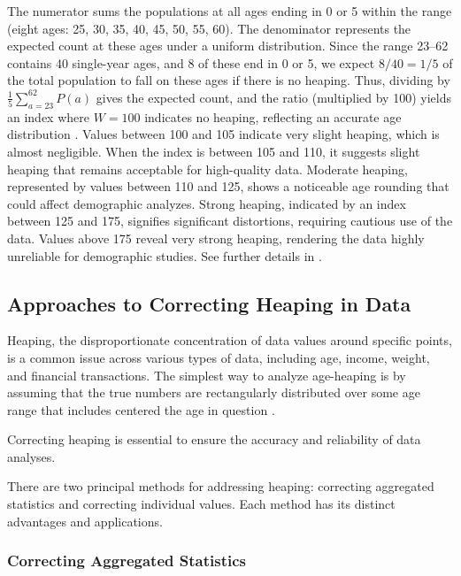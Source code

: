 \documentclass[12pt]{article}
\theoremstyle{plain}
\theoremstyle{definition}
\begin{document}
The numerator sums the populations at all ages ending in 0 or 5 within the
range (eight ages: 25, 30, 35, 40, 45, 50, 55, 60).
The denominator represents the expected count at these ages under
a uniform distribution. Since the range 23--62 contains 40 single-year ages,
and 8 of these end in 0 or 5, we expect $8/40 = 1/5$ of the total
population to fall on these ages if there is no heaping.
Thus, dividing by $\frac{1}{5} \sum_{a=23}^{62} P(a)$ gives the
expected count, and the ratio (multiplied by 100) yields an index
where $W = 100$ indicates no heaping, reflecting an accurate age distribution \citep{un55}.
Values between 100 and 105 indicate very slight heaping, which is almost negligible. When the index is between 105 and 110, it suggests slight heaping that remains acceptable for high-quality data. Moderate heaping, represented by values between 110 and 125, shows a noticeable age rounding that could affect demographic analyzes. Strong heaping, indicated by an index between 125 and 175, signifies significant distortions, requiring cautious use of the data. Values above 175 reveal very strong heaping, rendering the data highly unreliable for demographic studies. See further details in \citet{shryock76}.



\subsection{Approaches to Correcting Heaping in Data}

Heaping, the disproportionate concentration of data values around specific points, is a common issue across various types of data, including age, income, weight, and financial transactions.
The simplest way to analyze age-heaping is by assuming that the true numbers are rectangularly distributed over some age range that includes centered the age in question \citep{hobbs2004}.



Correcting heaping is essential to ensure the accuracy and reliability of data analyses.



There are two principal methods for addressing heaping: correcting aggregated statistics and correcting individual values. Each method has its distinct advantages and applications.

\subsubsection{Correcting Aggregated Statistics}
\end{document}
